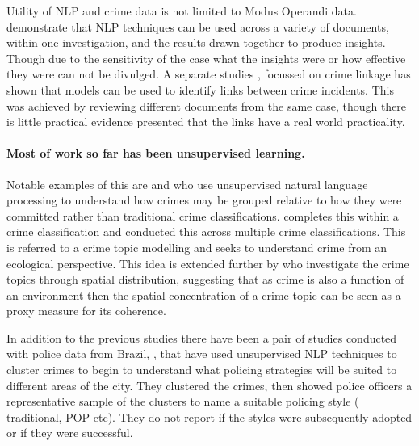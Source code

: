  
Utility of NLP and crime data is not limited to Modus Operandi data. \textcite{Helbich2013326} demonstrate that NLP techniques can be used across a variety of documents, within one investigation, and the results drawn together to produce  insights. Though due to the sensitivity of the case what the insights were or how effective they were can not be divulged. A separate studies  \textcite{cocx2006distance}, focussed on crime linkage has shown that models can be used to identify links between crime incidents. This was achieved by reviewing different documents from the same case, though there is little practical evidence presented that the links have a real world practicality. 

\paragraph{Most of work so far has been unsupervised learning.} Notable examples of this are \textcite{birks2020unsupervised} and \textcite{kuang2017crime} who use unsupervised natural language processing to understand how crimes may be grouped relative to how they were committed rather than traditional crime classifications. \textcite{birks2020unsupervised} completes this within a crime classification and \textcite{kuang2017crime} conducted this across multiple crime classifications. This is referred to a crime topic modelling and seeks to understand crime from an ecological perspective. This idea is extended further by \textcite{Pandey201876} who investigate the crime topics through spatial distribution, suggesting that as crime is also a function of an environment then the spatial concentration of a crime topic can be seen as a proxy measure for its coherence.


In addition to the previous studies there have been a pair of studies conducted with police data from Brazil, \parencite{Basilio2020849, Basilio2019333}, that have used unsupervised NLP techniques to cluster crimes to begin to understand what policing strategies will be suited to different areas of the city. They clustered the crimes, then showed police officers a representative sample of the clusters to name a suitable policing style ( traditional, POP etc). They do not report if the styles were subsequently adopted or if they were successful.


